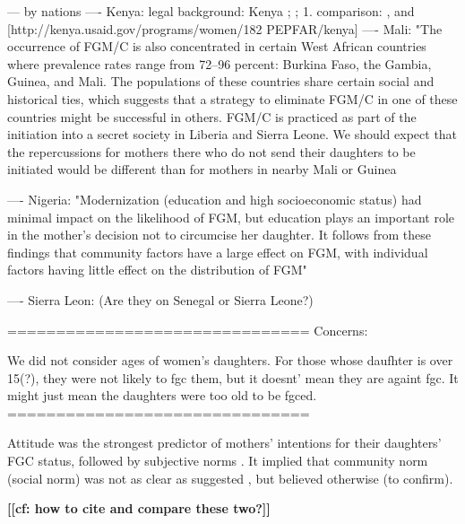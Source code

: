 \documentclass[12pt,]{article}
\newcommand{\comment}[1]{\textbf{[[#1]]}}
\begin{document}
--- by nations
---- Kenya: legal background:  Kenya \cite{GKEN01}; \cite{UNIC13}; 
1. comparison: \cite{Chia14, Hayf05}, and [http://kenya.usaid.gov/programs/women/182 PEPFAR/kenya]
---- Mali: "The occurrence of FGM/C is also concentrated in certain West African countries where prevalence rates range from 72–96 percent: Burkina Faso, the Gambia, Guinea, and Mali. The populations of these countries share certain social and historical ties, which suggests that a strategy to eliminate FGM/C in one of these countries might be successful in others. FGM/C is practiced as part of the initiation into a secret society in Liberia and Sierra Leone. We should expect that the repercussions for mothers there who do not send their daughters to be initiated would be different than for mothers in nearby Mali or Guinea \cite{YodaWang13}

---- Nigeria: "Modernization (education and high socioeconomic status) had minimal impact on the likelihood of FGM, but education plays an important role in the mother's decision not to circumcise her daughter. It follows from these findings that community factors have a large effect on FGM, with individual factors having little effect on the distribution of FGM" \cite{KandNwak09}

---- Sierra Leon: 
\cite{ShelHern06, ShelHern13}  (Are they on Senegal or Sierra Leone?)

===============================
Concerns:

We did not consider ages of women's daughters.  For those whose daufhter is over 15(?), they were not likely to fgc them, but it doesnt' mean they are againt fgc.  It might just mean the daughters were too old to be fgced. 
===============================


Attitude was the strongest predictor of mothers' intentions for their daughters' FGC status, followed by subjective norms \cite{PashPonn16}. It implied that community norm (social norm) was not as clear as suggested \cite{EffeVogt15}, but believed otherwise \cite{DuncWand11, Hayf06, Mack96, Mack00, Mack06, Youn02} (to confirm).


\comment{cf: how to cite \cite{AkhmWord13,EffeVogt15} and compare these two?}
\end{document}
